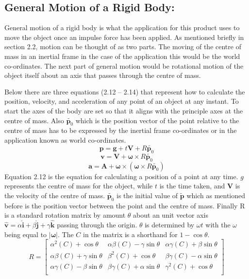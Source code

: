 \subsection{General Motion of a Rigid Body:}
General motion of a rigid body is what the application for this product uses to move the object once an impulse force has been applied.
As mentioned briefly in section 2.2, motion can be thought of as two parts.
The moving of the centre of mass in an inertial frame in the case of the application this would be the world co-ordinates.
The next part of general motion would be rotational motion of the object itself about an axis that passes through the centre of mass. 

Below there are three equations (2.12 – 2.14) that represent how to calculate the position, velocity, and acceleration of any point of an object at any instant.
To start the axes of the body are set so that it aligns with the principle axes at the centre of mass.
Also $\tilde{\mathbf{p}_{0}}$ which is the position vector of the point relative  to the centre of mass has to be expressed by the inertial frame co-ordinates or in the application known as world co-ordinates.
\begin{equation}
\mathbf{p}=\mathbf{g}+t\mathbf{V}+{R}\tilde{\mathbf{p}_{0}}
\end{equation}
\begin{equation}
\mathbf{v}=\mathbf{V}+\boldsymbol\omega\times{R}\tilde{\mathbf{p}_{0}}
\end{equation}
\begin{equation}
\mathbf{a}=\mathbf{A}+\boldsymbol\omega\times(\boldsymbol\omega\times{R}\tilde{\mathbf{p}_{0}})
\end{equation}
Equation 2.12 is the equation for calculating a position of a point at any time. $g$ represents the centre of mass for the object, while $t$ is the time taken, and $\mathbf{V}$ is the velocity of the centre of mass. $\tilde{\mathbf{p}_{0}}$ is the initial value of $\tilde{\mathbf{p}}$ which as mentioned before is the position vector between the point and the centre of mass.
Finally R is a standard rotation matrix by amount $\theta$ about an unit vector axis $\hat{\mathbf{v}} = \alpha\hat{\mathbf{i}} + \beta\hat{\mathbf{j}} + \gamma\hat{\mathbf{k}}$ passing through the origin.
$\theta$ is determined by $\omega t$ with the $\omega$ being equal to $|\boldsymbol{\omega}|$.
The $C$ in the matrix is a shorthand for $1-\cos\theta$.
\begin{equation}\label{ma:Rotation}
R = 
\begin{bmatrix}
  {\alpha}^{2}(C) + \cos\theta & 
  \alpha\beta(C) - \gamma\sin\theta & 
  \alpha\gamma(C) + \beta\sin\theta \\
  
  \alpha\beta(C) + \gamma\sin\theta & 
  {\beta}^{2}(C) + \cos\theta & 
  \beta\gamma(C) - \alpha\sin\theta \\
  
  \alpha\gamma(C) - \beta\sin\theta & 
  \beta\gamma(C) + \alpha\sin\theta & 
  {\gamma}^{2}(C) + \cos\theta \\
\end{bmatrix}
\end{equation}
